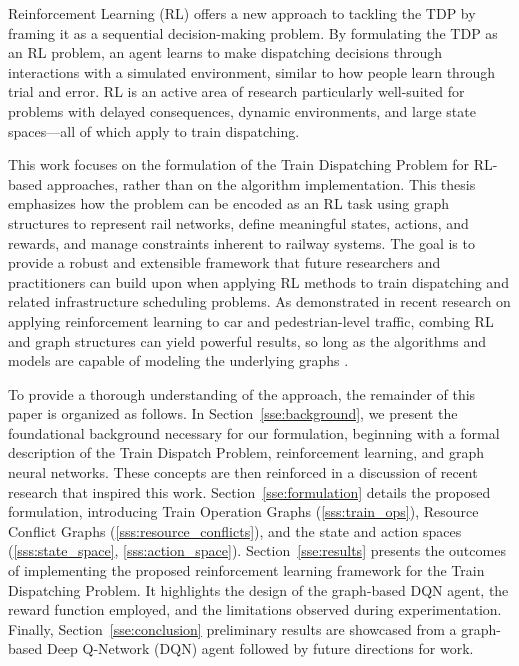 \documentclass[runningheads]{llncs}
\begin{document}
Reinforcement Learning (RL) offers a new approach to tackling the TDP by framing it as a sequential decision-making problem.
By formulating the TDP as an RL problem, an agent learns to make dispatching decisions through interactions with a simulated environment, similar to how people learn through trial and error. 
RL is an active area of research particularly well-suited for problems with delayed consequences, dynamic environments, and large state spaces—all of which apply to train dispatching. 

This work focuses on the formulation of the Train Dispatching Problem for RL-based approaches, rather than on the algorithm implementation. 
This thesis emphasizes how the problem can be encoded as an RL task using graph structures to represent rail networks, define meaningful states, actions, and rewards, and manage constraints inherent to railway systems. 
The goal is to provide a robust and extensible framework that future researchers and practitioners can build upon when applying RL methods to train dispatching and related infrastructure scheduling problems.
As demonstrated in recent research on applying reinforcement learning to car and pedestrian-level traffic, combing RL and graph structures can yield powerful results, so long as the algorithms and models are capable of modeling the underlying graphs \cite{gnndrl:Devailly_2022}.

To provide a thorough understanding of the approach, the remainder of this paper is organized as follows. 
In Section~\ref{sse:background}, we present the foundational background necessary for our formulation, beginning with a formal description of the Train Dispatch Problem, reinforcement learning, and graph neural networks.
These concepts are then reinforced in a discussion of recent research that inspired this work.
Section~\ref{sse:formulation} details the proposed formulation, introducing Train Operation Graphs (\ref{sss:train_ops}), Resource Conflict Graphs (\ref{sss:resource_conflicts}), and the state and action spaces (\ref{sss:state_space}, \ref{sss:action_space}). 
Section~\ref{sse:results} presents the outcomes of implementing the proposed reinforcement learning framework for the Train Dispatching Problem. It highlights the design of the graph-based DQN agent, the reward function employed, and the limitations observed during experimentation.
Finally, Section~\ref{sse:conclusion} preliminary results are showcased from a graph-based Deep Q-Network (DQN) agent followed by future directions for work.
\end{document}
